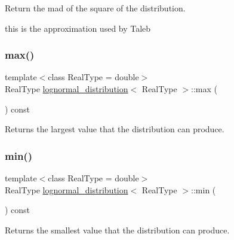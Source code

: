 Return the mad of the square of the distribution. 

this is the approximation used by Taleb \mbox{\label{structlognormal__distribution_a2de6f05fe434834c076a67fafc311357}} 
\subsubsection{\texorpdfstring{max()}{max()}}
{\footnotesize\ttfamily template$<$class Real\+Type  = double$>$ \\
Real\+Type \mbox{\hyperlink{structlognormal__distribution}{lognormal\+\_\+distribution}}$<$ Real\+Type $>$\+::max (\begin{DoxyParamCaption}{ }\end{DoxyParamCaption}) const\hspace{0.3cm}{\ttfamily [inline]}}



Returns the largest value that the distribution can produce. 

\mbox{\label{structlognormal__distribution_afedf3fef881e7b36d429b50f34ef1573}} 
\subsubsection{\texorpdfstring{min()}{min()}}
{\footnotesize\ttfamily template$<$class Real\+Type  = double$>$ \\
Real\+Type \mbox{\hyperlink{structlognormal__distribution}{lognormal\+\_\+distribution}}$<$ Real\+Type $>$\+::min (\begin{DoxyParamCaption}{ }\end{DoxyParamCaption}) const\hspace{0.3cm}{\ttfamily [inline]}}



Returns the smallest value that the distribution can produce. 

\mbox{\label{structlognormal__distribution_a0bf3bc670b041d5015d9a4a88d6220a4}} 
